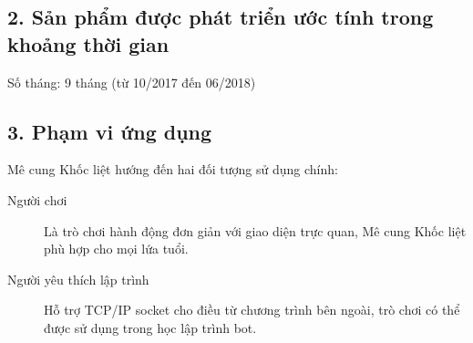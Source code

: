 \documentclass[a4paper,12pt]{article}
\begin{document}
\subsection*{2. Sản phẩm được phát triển ước tính trong khoảng thời gian}
Số tháng: 9 tháng (từ 10/2017 đến 06/2018)

\subsection*{3. Phạm vi ứng dụng}
Mê cung Khốc liệt hướng đến hai đối tượng sử dụng chính:

\begin{description}
  \item[Người chơi] Là trò chơi hành động đơn giản với giao diện trực quan, Mê
    cung Khốc liệt phù hợp cho mọi lứa tuổi.
  \item[Người yêu thích lập trình] Hỗ trợ TCP/IP socket cho điều từ chương
    trình bên ngoài, trò chơi có thể được sử dụng trong học lập trình bot.
\end{description}
\end{document}
